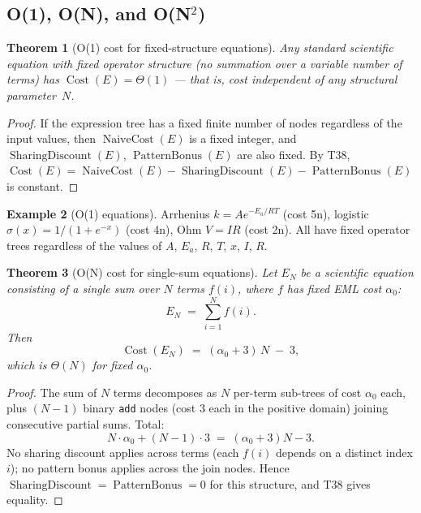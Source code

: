 \documentclass[12pt,a4paper]{article}
\newtheorem{theorem}{Theorem}[section]
\theoremstyle{definition}
\newtheorem{example}[theorem]{Example}
\newcommand{\Cost}{\operatorname{Cost}}
\newcommand{\NC}{\operatorname{NaiveCost}}
\newcommand{\SD}{\operatorname{SharingDiscount}}
\newcommand{\PB}{\operatorname{PatternBonus}}
\begin{document}
\subsection{O(1), O(N), and O(N\texorpdfstring{$^2$}{²})}

\begin{theorem}[O(1) cost for fixed-structure equations]
\label{thm:O1}
Any standard scientific equation with fixed operator structure (no summation
over a variable number of terms) has $\Cost(E) = \Theta(1)$ --- that is, cost
independent of any structural parameter~$N$.
\end{theorem}

\begin{proof}
If the expression tree has a fixed finite number of nodes regardless of the
input values, then $\NC(E)$ is a fixed integer, and $\SD(E)$, $\PB(E)$ are
also fixed.  By T38, $\Cost(E) = \NC(E) - \SD(E) - \PB(E)$ is constant.
\end{proof}

\begin{example}[O(1) equations]
Arrhenius $k = Ae^{-E_a/RT}$ (cost 5n), logistic $\sigma(x) = 1/(1+e^{-x})$
(cost 4n), Ohm $V = IR$ (cost 2n).  All have fixed operator trees regardless
of the values of $A$, $E_a$, $R$, $T$, $x$, $I$, $R$.
\end{example}

\begin{theorem}[O(N) cost for single-sum equations]
\label{thm:ON}
Let $E_N$ be a scientific equation consisting of a single sum over $N$ terms
$f(i)$, where $f$ has fixed EML cost $\alpha_0$:
\[
  E_N \;=\; \sum_{i=1}^{N} f(i).
\]
Then
\[
  \Cost(E_N) \;=\; (\alpha_0 + 3)\,N \;-\; 3,
\]
which is $\Theta(N)$ for fixed $\alpha_0$.
\end{theorem}

\begin{proof}
The sum of $N$ terms decomposes as $N$ per-term sub-trees of cost $\alpha_0$
each, plus $(N-1)$ binary \texttt{add} nodes (cost 3 each in the positive
domain) joining consecutive partial sums.  Total:
\[
  N \cdot \alpha_0 + (N-1) \cdot 3 \;=\; (\alpha_0 + 3)N - 3.
\]
No sharing discount applies across terms (each $f(i)$ depends on a distinct
index $i$); no pattern bonus applies across the join nodes.  Hence
$\SD = \PB = 0$ for this structure, and T38 gives equality.
\end{proof}
\end{document}

